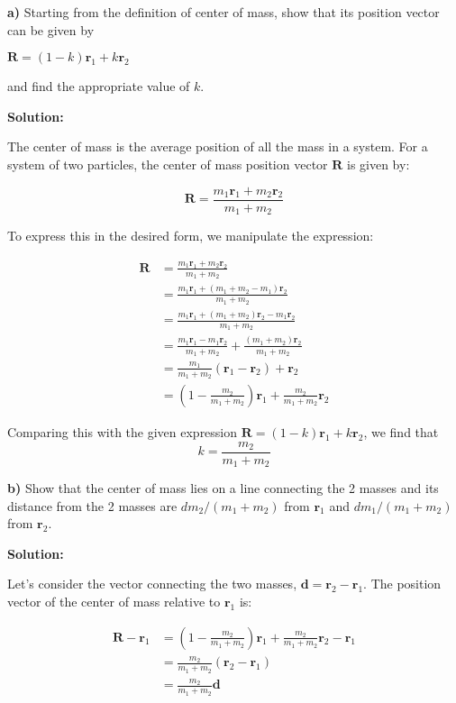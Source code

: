 \documentclass{article}
\begin{document}
\textbf{a)} Starting from the definition of center of mass, show that its position vector can be given by 

  $\mathbf{R} = (1 - k)\mathbf{r}_1 + k\mathbf{r}_2$ 

  and find the appropriate value of $k$.

\textbf{Solution:}

The center of mass is the average position of all the mass in a system.  For a system of two particles, the center of mass position vector $\mathbf{R}$ is given by:

\begin{equation*}
\mathbf{R} = \frac{m_1 \mathbf{r}_1 + m_2 \mathbf{r}_2}{m_1 + m_2} 
\end{equation*}

To express this in the desired form, we manipulate the expression:

\begin{align*}
\mathbf{R} &= \frac{m_1 \mathbf{r}_1 + m_2 \mathbf{r}_2}{m_1 + m_2} \\
&= \frac{m_1 \mathbf{r}_1 + (m_1 + m_2 - m_1)\mathbf{r}_2}{m_1 + m_2} \\
&= \frac{m_1 \mathbf{r}_1 + (m_1 + m_2)\mathbf{r}_2 - m_1\mathbf{r}_2}{m_1 + m_2} \\
&= \frac{m_1 \mathbf{r}_1 - m_1\mathbf{r}_2}{m_1 + m_2} + \frac{(m_1 + m_2)\mathbf{r}_2}{m_1 + m_2} \\
&= \frac{m_1}{m_1 + m_2}(\mathbf{r}_1 - \mathbf{r}_2) + \mathbf{r}_2 \\
&= \left( 1 - \frac{m_2}{m_1 + m_2} \right) \mathbf{r}_1 + \frac{m_2}{m_1 + m_2} \mathbf{r}_2
\end{align*}

Comparing this with the given expression $\mathbf{R} = (1 - k)\mathbf{r}_1 + k\mathbf{r}_2$, we find that 
\begin{equation*}
k = \frac{m_2}{m_1 + m_2}
\end{equation*}

\textbf{b)} Show that the center of mass lies on a line connecting the 2 masses and its distance from the 2 masses are $dm_2/(m_1 + m_2)$ from $\mathbf{r}_1$ and $dm_1/(m_1 + m_2)$ from $\mathbf{r}_2$.

\textbf{Solution:}

Let's consider the vector connecting the two masses, $\mathbf{d} = \mathbf{r}_2 - \mathbf{r}_1$.  The position vector of the center of mass relative to $\mathbf{r}_1$ is:

\begin{align*}
\mathbf{R} - \mathbf{r}_1 &= \left( 1 - \frac{m_2}{m_1 + m_2} \right) \mathbf{r}_1 + \frac{m_2}{m_1 + m_2} \mathbf{r}_2 - \mathbf{r}_1 \\
&= \frac{m_2}{m_1 + m_2} (\mathbf{r}_2 - \mathbf{r}_1) \\
&= \frac{m_2}{m_1 + m_2} \mathbf{d}
\end{align*}
\end{document}
